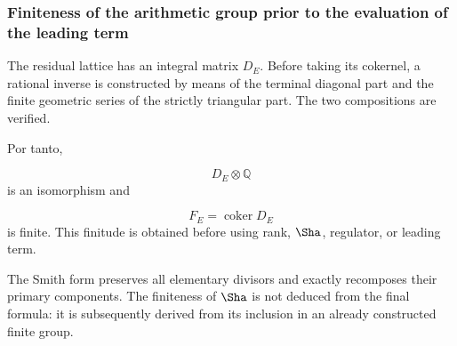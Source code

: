 \subsubsection{Finiteness of the arithmetic group prior to the evaluation of the leading term}
The residual lattice has an integral matrix \(D_E\). Before taking its cokernel, a rational inverse is constructed by means of the terminal diagonal part and the finite geometric series of the strictly triangular part. The two compositions are verified.\par
{}
Por tanto,\par
\[
D_E\otimes\mathbb Q
\]
is an isomorphism and\par
\[
F_E=\operatorname{coker}D_E
\]
is finite. This finitude is obtained before using rank, \(\Sha\), regulator, or leading term.\par
The Smith form preserves all elementary divisors and exactly recomposes their primary components. The finiteness of \(\Sha\) is not deduced from the final formula: it is subsequently derived from its inclusion in an already constructed finite group.\par
{}

